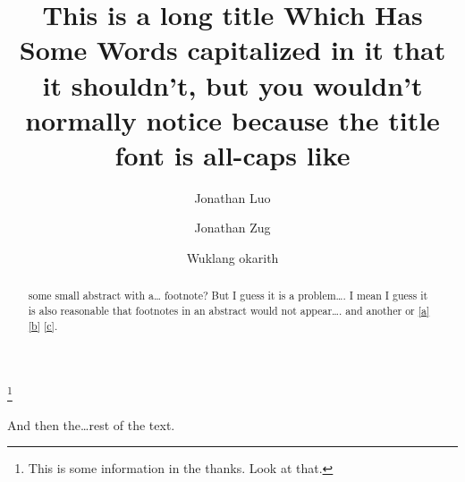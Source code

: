 \documentclass{amsart}
\begin{document}
\title{This is a long title Which Has Some Words capitalized in it that it shouldn't, but you wouldn't normally notice because the title font is all-caps like}
\author{Jonathan Luo}
\address{Gorgeoso luiville and what is you deal; {\normalfont and} sure thing anyway}

\author{Jonathan Zug}
\address{ponderoso squatch and some other stuff, man}

\author{Wuklang okarith}
\address{ostensinobal quickdraw and the principle difference cluster}

\thanks{This is some information in the thanks. Look at that.}


\begin{abstract}
some small %
abstract with a\dots{} footnote? But I guess it is a problem\dots. %
I mean I guess it %
is also reasonable that footnotes in an abstract %
would not appear\dots. \cite{thing} and another \cite{thing} or \eqref{a} \eqref{b} \eqref{c}.
\end{abstract}

\maketitle

And %
then the\dots rest of the text.
\end{document}
